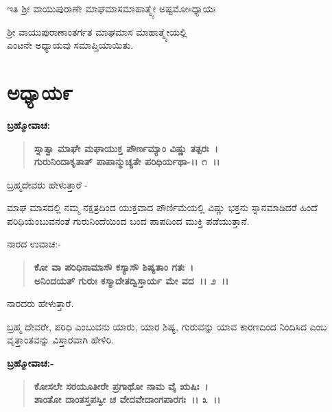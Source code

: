 \begin{center}
ಇತಿ ಶ‍್ರೀ ವಾಯುಪುರಾಣೇ ಮಾಘಮಾಸಮಾಹಾತ್ಮ್ಯೇ ಅಷ್ಟಮೋsಧ್ಯಾಯಃ
\end{center}

\begin{center}
 ಶ‍್ರೀ ವಾಯುಪುರಾಣಾಂತರ್ಗತ ಮಾಘಮಾಸ ಮಾಹಾತ್ಮ್ಯೇಯಲ್ಲಿ \\ ಎಂಟನೇ ಅಧ್ಯಾಯವು ಸಮಾಪ್ತಿಯಾಯಿತು.
\end{center}

\newpage

\section*{ಅಧ್ಯಾಯ\enginline{-}೯}

\emptypage

\begin{flushleft}
\textbf{ಬ್ರಹ್ಮೋವಾಚ:\enginline{-} }
\end{flushleft}

\begin{verse}
\textbf{ಸ್ನಾತ್ವಾ ಮಾಘೇ ಮಘಾಯುಕ್ತ ಪೌರ್ಣಮ್ಯಾಂ ವಿಷ್ಣು ತತ್ಪರಃ~।}\\\textbf{ಗುರುನಿಂದಾಕೃತಾತ್ ಪಾಪಾನ್ಮುಚ್ಯತೇ ಪರಿಧಿರ್ಯಥಾ-।। ೧~।।}
\end{verse}

\begin{flushleft}
ಬ್ರಹ್ಮದೇವರು ಹೇಳುತ್ತಾರೆ -
\end{flushleft}

ಮಾಘ ಮಾಸದಲ್ಲಿ ನಮ್ಮ ನಕ್ಷತ್ರದಿಂದ ಯುಕ್ತವಾದ ಪೌರ್ಣಿಮೆಯಲ್ಲಿ ವಿಷ್ಣು ಭಕ್ತನು ಸ್ನಾನಮಾಡಿದರೆ ಹಿಂದೆ ಪರಿಧಿಯೆಂಬುವನಂತೆ ಗುರುನಿಂದೆಯಿಂದ ಬಂದ ಪಾಪದಿಂದ ಮುಕ್ತಿ ಪಡೆಯುತ್ತಾನೆ. 

\noindent
ನಾರದ ಉವಾಚ:-

\begin{verse}
\textbf{ಕೋ ವಾ ಪರಿಧಿನಾಮಾಸೌ ಕಸ್ಯಾಸೌ ಶಿಷ್ಯತಾಂ ಗತಃ~।}\\\textbf{ಅನಿಂದಯತ್ ಗುರುಃ ಕಸ್ಮಾದೇತದ್ವಿಸ್ತಾರ್ಯ ಮೇ ವದ~।। ೨~।। }
\end{verse}

\begin{flushleft}
ನಾರದರು ಹೇಳುತ್ತಾರೆ.
\end{flushleft}

ಬ್ರಹ್ಮ ದೇವರೇ, ಪರಿಧಿ ಎಂಬುವನು ಯಾರು, ಯಾರ ಶಿಷ್ಯ, ಗುರುವನ್ನು ಯಾವ ಕಾರಣದಿಂದ ನಿಂದಿಸಿದ ಎಂಬ ವೃತ್ತಾಂತವನ್ನು ವಿಸ್ತಾರವಾಗಿ ಹೇಳಿರಿ.

\begin{flushleft}
\textbf{ಬ್ರಹ್ಮೋವಾಚ:- }
\end{flushleft}

\begin{verse}
\textbf{ಕೋಸಲೇ ಸರಯೂತೀರೇ ಪ್ರಗಾಥೋ ನಾಮ ವೈ ಋಷಿಃ~।}\\\textbf{ಶಾಂತೋ ದಾಂತಸ್ತಪಸ್ವೀ ಚ ವೇದವೇದಾಂಗಪಾರಗಃ~।। ೩~।।}
\end{verse}

